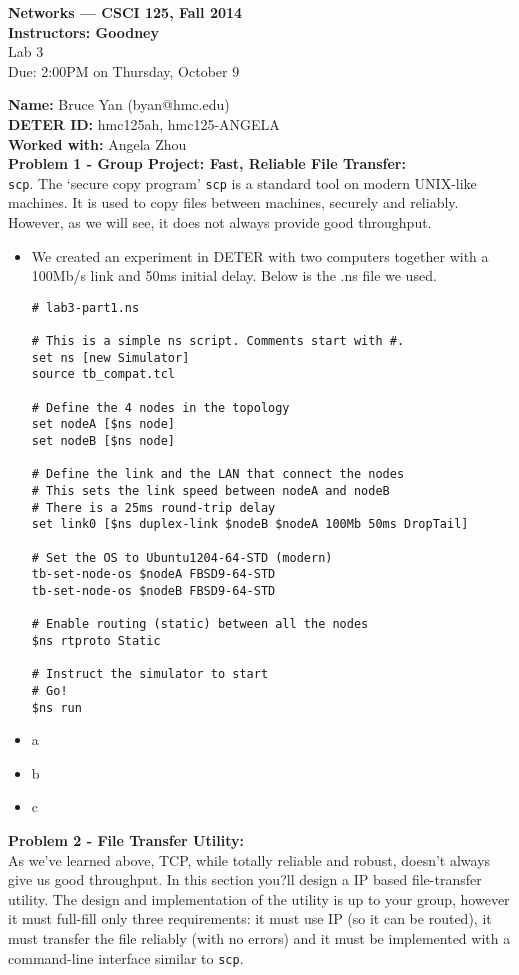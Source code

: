 \documentclass[10pt]{article}
\newcommand{\Problem}[1]{\noindent \textbf{\textbf{Problem #1:  \\ }}}
\newcommand{\Name}[1]{\noindent \textbf{Name:} #1 \\}
\newcommand{\Workedwith}[1]{\noindent \textbf{Worked with:} #1 \\}
\newcommand{\psheader}[2]{
  \begin{center}{\bf Networks --- CSCI 125, Fall 2014 \\
    Instructors: Goodney \\}
    Lab #1 \\
    Due: 2:00PM on #2
    \vspace*{.5cm}
  \end{center}
}
\newcommand{\DeterLabID}[1]{\noindent \textbf{DETER ID:} #1 \\}
\begin{document}
\psheader{3}{Thursday, October 9}


\Name{Bruce Yan (byan@hmc.edu)}
\DeterLabID{hmc125ah, hmc125-ANGELA}
\Workedwith{Angela Zhou}

\Problem{1 - Group Project: Fast, Reliable File Transfer}
\texttt{scp}. The `secure copy program' \texttt{scp} is a standard tool on modern UNIX-like machines. It is used to copy files between machines, securely and reliably. However, as we will see, it does not always provide good throughput.
\begin{itemize}
\itemsep0em
\item We created an experiment in DETER with two computers together with a 100Mb/s link and 50ms initial delay.  Below is the .ns file we used.
\begin{lstlisting}
# lab3-part1.ns

# This is a simple ns script. Comments start with #.
set ns [new Simulator]
source tb_compat.tcl

# Define the 4 nodes in the topology
set nodeA [$ns node]
set nodeB [$ns node]

# Define the link and the LAN that connect the nodes
# This sets the link speed between nodeA and nodeB
# There is a 25ms round-trip delay
set link0 [$ns duplex-link $nodeB $nodeA 100Mb 50ms DropTail]

# Set the OS to Ubuntu1204-64-STD (modern)
tb-set-node-os $nodeA FBSD9-64-STD
tb-set-node-os $nodeB FBSD9-64-STD

# Enable routing (static) between all the nodes
$ns rtproto Static

# Instruct the simulator to start
# Go!
$ns run
\end{lstlisting}
\item a
\item b
\item c
\end{itemize}

\newpage


\Problem{2 - File Transfer Utility}
As we've learned above, TCP, while totally reliable and robust, doesn't always give us good throughput. In this section you?ll design a IP based file-transfer utility. The design and implementation of the utility is up to your group, however it must full-fill only three requirements: it must use IP (so it can be routed), it must transfer the file reliably (with no errors) and it must be implemented with a command-line interface similar to \texttt{scp}.
\end{document}
